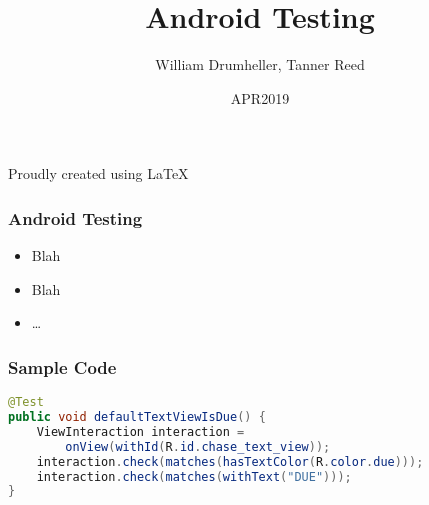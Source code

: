 \documentclass[10pt]{beamer}
\title{Android Testing}
\author{William Drumheller, Tanner Reed}
\date{APR2019}
\begin{document}
\begin{frame}
\titlepage
\begin{center}
Proudly created using \LaTeX
\end{center}
\end{frame}

\begin{frame}
\frametitle{Android Testing}
\begin{itemize}
    \item Blah
    \item Blah
    \item \dots
\end{itemize}
\end{frame}

\begin{frame}[fragile]
\frametitle{Sample Code}
\begin{lstlisting}[language=java,caption={Sample Code}]
@Test
public void defaultTextViewIsDue() {
    ViewInteraction interaction =
        onView(withId(R.id.chase_text_view));
    interaction.check(matches(hasTextColor(R.color.due)));
    interaction.check(matches(withText("DUE")));
}
\end{lstlisting}
\end{frame}
\end{document}
